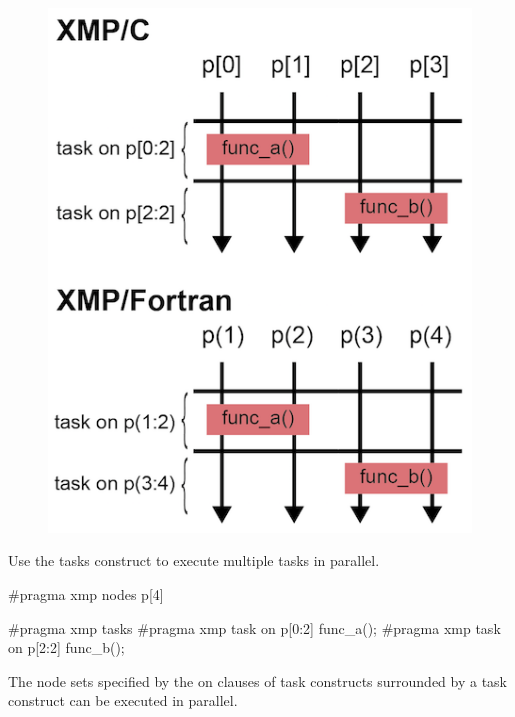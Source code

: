 \begin{figure}
  \centering
  \includegraphics{figs/task_noparallel.png}
\end{figure}

Use the tasks construct to execute multiple tasks in parallel.

\begin{XCexample}
#pragma xmp nodes p[4]

#pragma xmp tasks
{
#pragma xmp task on p[0:2]
{
  func_a();
}
#pragma xmp task on p[2:2]
{
  func_b();
}
}
\end{XCexample}


The node sets specified by the on clauses of task constructs surrounded
by a task construct can be executed in parallel.

